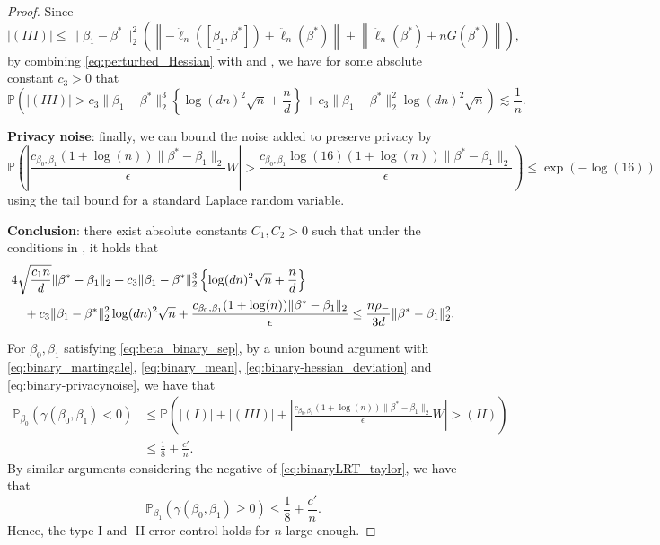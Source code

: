 \documentclass[11pt]{article}
\begin{document}
\begin{proof}
Since 
\begin{equation*}
    |(III)| \leq \|\beta_1-\beta^*\|^2_2 \left( \left\| - \underline{\ddot{\ell}_n([\beta_1, \beta^*])} + \ddot{\ell}_n(\beta^*) \right\| + \left\|  \ddot{\ell}_n(\beta^*) + nG(\beta^*) \right\|\right),
\end{equation*} 
by combining \eqref{eq:perturbed_Hessian} with  and , we have for some absolute constant $c_3>0$ that
\begin{equation}
    \mathbb{P} \left( \left|(III) \right| > c_3 \|\beta_1 - \beta^*\|_2^3
    \left\{  \log(dn)^2\sqrt{n} + \frac{n}{d} \right\} + c_3 \|\beta_1 - \beta^*\|^2_2 \log(dn)^2 \sqrt{n} \right) \lesssim \frac{1}{n}. 
    \label{eq:binary-hessian_deviation}
\end{equation}

\bigskip
\noindent \textbf{Privacy noise}: finally, we can bound the noise added to preserve privacy by
\begin{equation}
    \mathbb{P} \left( \left|\frac{c_{\beta_0, \beta_1} (1+\log(n))\|\beta^* - \beta_1\|_2}{\epsilon} W \right| > \frac{c_{\beta_0, \beta_1} \log(16) (1+\log(n))\|\beta^*-\beta_1\|_2}{\epsilon} \right) \leq \exp(-\log(16))
    \label{eq:binary-privacynoise}
\end{equation}
using the tail bound for a standard Laplace random variable. 

\bigskip
\noindent \textbf{Conclusion}: there exist absolute constants $C_1, C_2>0$ such that under the conditions in , it holds that 
\begin{align}
    &4\sqrt{\frac{c_1n}{d}} \|\beta^* - \beta_1\|_2 + c_3\|\beta_1 - \beta^*\|_2^3
    \left\{  \log(dn)^2\sqrt{n} + \frac{n}{d} \right\} \notag\\
    & \quad+ c_3\|\beta_1 - \beta^*\|^2_2 \log(dn)^2 \sqrt{n} + \frac{c_{\beta_0, \beta_1}(1+\log(n))\|\beta^* - \beta_1\|_2}{\epsilon} \leq \frac{n\rho_-}{3d} \|\beta^* - \beta_1\|_2^2.
    \label{eq:beta_binary_sep}
\end{align}

For $\beta_0, \beta_1$ satisfying \eqref{eq:beta_binary_sep}, by a union bound argument with \eqref{eq:binary_martingale}, \eqref{eq:binary_mean}, \eqref{eq:binary-hessian_deviation} and \eqref{eq:binary-privacynoise}, we have that 
\begin{align*}
    \mathbb{P}_{\beta_0}(\gamma(\beta_0, \beta_1) < 0 ) &\leq \mathbb{P} \left( |(I)| + |(III)| + \left|\frac{c_{\beta_0, \beta_1} (1+\log(n))\|\beta^* - \beta_1\|_2}{\epsilon} W \right| > (II) \right)  \\
    &\leq \frac{1}{8} + \frac{c'}{n}.
\end{align*}
By similar arguments considering the negative of \eqref{eq:binaryLRT_taylor}, we have that 
\begin{equation*}
    \mathbb{P}_{\beta_1}(\gamma(\beta_0, \beta_1) \geq  0) \leq \frac{1}{8} + \frac{c'}{n}. 
\end{equation*}
Hence, the type-I and -II error control holds for $n$ large enough. 
\end{proof}
\end{document}
